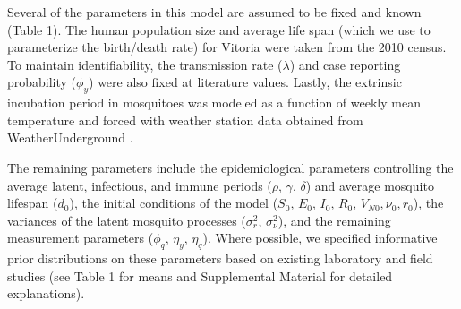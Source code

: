\documentclass[10pt,letterpaper]{article}
\begin{document}
Several of the parameters in this model are assumed to be fixed and known (Table 1).
The human population size and average life span (which we use to parameterize the birth/death rate) for Vitoria were taken from the 2010 census.
To maintain identifiability, the transmission rate ($\lambda$) and case reporting probability ($\phi_y$) were also fixed at literature values.
Lastly, the extrinsic incubation period in mosquitoes was modeled as a function of weekly mean temperature and forced with weather station data obtained from WeatherUnderground \cite{weather}.

The remaining parameters include the epidemiological parameters controlling the average latent, infectious, and immune periods ($\rho$, $\gamma$, $\delta$) and average mosquito lifespan ($d_0$), the initial conditions of the model ($S_0$, $E_0$, $I_0$, $R_0$, $V_{N0}, \nu_0, r_0$), the variances of the latent mosquito processes ($\sigma^2_r$, $\sigma^2_{\nu}$), and the remaining measurement parameters ($\phi_q$, $\eta_y$, $\eta_q$).  
Where possible, we specified informative prior distributions on these parameters based on existing laboratory and field studies (see Table 1 for means and Supplemental Material for detailed explanations).
\end{document}
